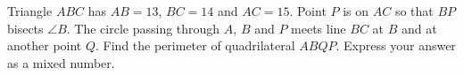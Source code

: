 Triangle $ABC$ has $AB=13$, $BC=14$ and $AC=15$. Point $P$ is on $AC$ so that $BP$ bisects $\angle B$. The circle passing through $A$, $B$ and $P$ meets line $BC$ at $B$ and at another point $Q$. Find the perimeter of quadrilateral $ABQP$. Express your answer as a mixed number.
